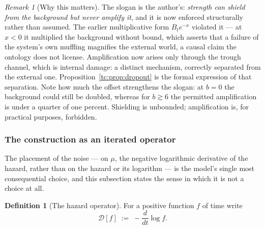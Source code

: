 \documentclass[11pt]{article}
\numberwithin{equation}{section}
\theoremstyle{plain}
\theoremstyle{definition}
\newtheorem{definition}[theorem]{Definition}
\theoremstyle{remark}
\newtheorem{remark}[theorem]{Remark}
\begin{document}
\begin{remark}[Why this matters]\label{tc:rem:asymmetry}
The slogan is the author's: \emph{strength can shield from the
background but never amplify it}, and it is now enforced structurally
rather than assumed. The earlier multiplicative form $B_te^{-x}$
violated it --- at $x<0$ it multiplied the background without bound,
which asserts that a failure of the system's own muffling magnifies the
external world, a causal claim the ontology does not license.
Amplification now arises only through the trough channel, which is
internal damage: a distinct mechanism, correctly separated from the
external one. Proposition~\ref{tc:prop:dropout} is the formal expression
of that separation. Note how much the offset strengthens the slogan: at
$b=0$ the background could still be doubled, whereas for $b\gtrsim6$ the
permitted amplification is under a quarter of one percent. Shielding is
unbounded; amplification is, for practical purposes, forbidden.
\end{remark}

\subsubsection{The construction as an iterated operator}
\label{gr1:subsub:operator}

The placement of the noise --- on $\mu$, the negative logarithmic
derivative of the hazard, rather than on the hazard or its logarithm ---
is the model's single most consequential choice, and this subsection
states the sense in which it is not a choice at all.

\begin{definition}[The hazard operator]\label{gr1:def:operator}
For a positive function $f$ of time write
\begin{equation}\label{gr1:eq:operator}
\mathcal D[f]\;:=\;-\frac{d}{dt}\log f .
\end{equation}
\end{definition}
\end{document}
